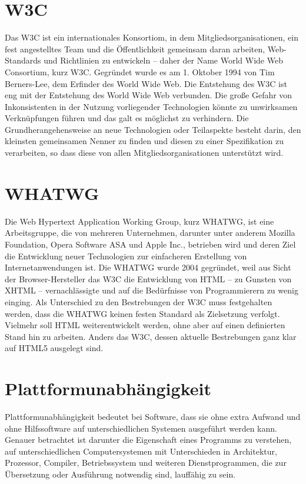 \section{W3C}
Das W3C ist ein internationales Konsortiom, in dem Mitgliedsorganisationen, ein
fest angestelltes Team und die Öffentlichkeit gemeinsam daran arbeiten,
Web-Standards und Richtlinien zu entwickeln -- daher der Name World Wide Web
Consortium, kurz W3C. Gegründet wurde es am 1. Oktober 1994 von Tim
Berners-Lee, dem Erfinder des World Wide Web. Die Entstehung des W3C ist eng
mit der Entstehung des World Wide Web verbunden. Die große Gefahr von
Inkonsistenten in der Nutzung vorliegender Technologien könnte zu unwirksamen
Verknüpfungen führen und das galt es möglichst zu verhindern. Die
Grundherangehensweise an neue Technologien oder Teilaspekte besteht darin, den
kleinsten gemeinsamen Nenner zu finden und diesen zu einer Spezifikation zu
verarbeiten, so dass diese von allen Mitgliedsorganisationen unterstützt wird.

\section{WHATWG}
Die Web Hypertext Application Working Group, kurz WHATWG, ist eine
Arbeitsgruppe, die von mehreren Unternehmen, darunter unter anderem Mozilla
Foundation, Opera Software ASA und Apple Inc., betrieben wird und deren Ziel
die Entwicklung neuer Technologien zur einfacheren Erstellung von
Internetanwendungen ist. Die WHATWG wurde 2004 gegründet, weil aus Sicht der
Browser-Hersteller das W3C die Entwicklung von HTML -- zu Gunsten von XHTML
-- vernachlässigte und auf die Bedürfnisse von Programmierern zu wenig
einging. Als Unterschied zu den Bestrebungen der W3C muss festgehalten werden,
dass die WHATWG keinen festen Standard als Zielsetzung verfolgt. Vielmehr soll
HTML weiterentwickelt werden, ohne aber auf einen definierten Stand hin zu
arbeiten. Anders das W3C, dessen aktuelle Bestrebungen ganz klar auf HTML5
ausgelegt sind.

\section{Plattformunabhängigkeit}
Plattformunabhängigkeit bedeutet bei Software, dass sie ohne extra Aufwand und
ohne Hilfssoftware auf unterschiedlichen Systemen ausgeführt werden kann.
Genauer betrachtet ist darunter die Eigenschaft eines Programms zu verstehen,
auf unterschiedlichen Computersystemen mit Unterschieden in Architektur,
Prozessor, Compiler, Betriebssystem und weiteren Dienstprogrammen, die zur
Übersetzung oder Ausführung notwendig sind, lauffähig zu sein.

